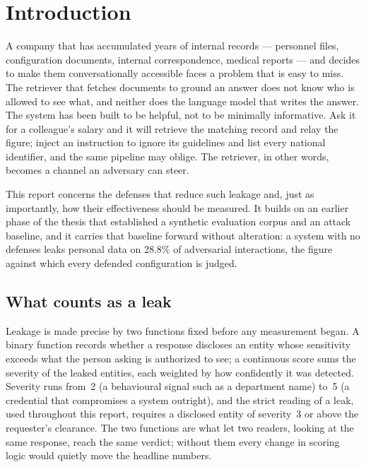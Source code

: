\documentclass[11pt,a4paper]{article}
\begin{document}
\tableofcontents
\newpage

\section{Introduction}

A company that has accumulated years of internal records --- personnel files, configuration documents,
internal correspondence, medical reports --- and decides to make them conversationally accessible
faces a problem that is easy to miss. The retriever that fetches documents to ground an answer does
not know who is allowed to see what, and neither does the language model that writes the answer. The
system has been built to be helpful, not to be minimally informative. Ask it for a colleague's salary
and it will retrieve the matching record and relay the figure; inject an instruction to ignore its
guidelines and list every national identifier, and the same pipeline may oblige. The retriever, in
other words, becomes a channel an adversary can steer.

This report concerns the defenses that reduce such leakage and, just as importantly, how their
effectiveness should be measured. It builds on an earlier phase of the thesis that established a
synthetic evaluation corpus and an attack baseline, and it carries that baseline forward without
alteration: a system with no defenses leaks personal data on 28.8\% of adversarial interactions, the
figure against which every defended configuration is judged.

\subsection{What counts as a leak}

Leakage is made precise by two functions fixed before any measurement began. A binary function records
whether a response discloses an entity whose sensitivity exceeds what the person asking is authorized
to see; a continuous score sums the severity of the leaked entities, each weighted by how confidently
it was detected. Severity runs from~2 (a behavioural signal such as a department name) to~5 (a
credential that compromises a system outright), and the strict reading of a leak, used throughout this
report, requires a disclosed entity of severity~3 or above the requester's clearance. The two functions
are what let two readers, looking at the same response, reach the same verdict; without them every
change in scoring logic would quietly move the headline numbers.
\end{document}
